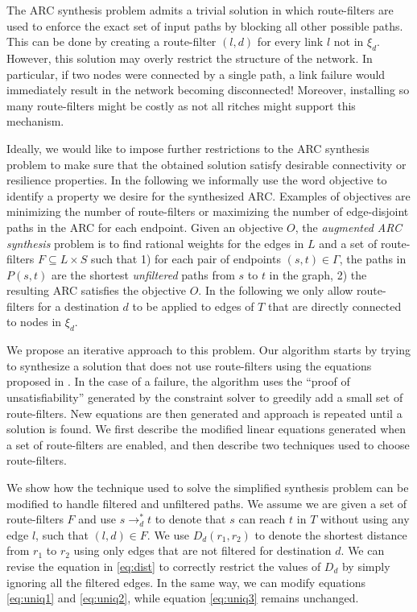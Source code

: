 The ARC synthesis problem admits a trivial solution in which 
route-filters are used to enforce the exact set of input paths by blocking all other possible paths.
This can be done by creating a 
route-filter $(l,d)$ for every link $l$ not in $\xi_d$. 
However, this solution may overly restrict the structure of the network.
In particular, if two nodes were connected by a single path,
a link failure would immediately result in the network becoming disconnected!
Moreover, installing so many route-filters might be costly as not all ritches might
support this mechanism.

Ideally, we would like to impose further restrictions to the ARC
synthesis problem to make sure that the obtained solution
satisfy desirable connectivity or resilience properties.
In the following we informally use the word objective 
to identify a property we desire for the synthesized ARC.
Examples of objectives are minimizing the number of route-filters
or maximizing the number of edge-disjoint paths in the ARC
for each endpoint. 
Given an objective $O$, the \emph{augmented ARC synthesis} problem
is to find rational weights for the edges in $L$
and a set of route-filters $F\subseteq L\times S$
 such that 
1) for each pair of endpoints $(s,t) \in \Gamma$, 
the paths in $P(s,t)$ are the shortest \emph{unfiltered} paths from $s$ to $t$ 
in the graph,
2) the resulting ARC satisfies the objective $O$. 
In the following we only allow route-filters for a destination $d$ to be applied to edges of $T$ that are directly connected to 
nodes in $\xi_d$. 

We propose an iterative approach to this problem. 
Our algorithm starts by trying to synthesize a solution
that does not use route-filters using the equations proposed in . 
In the case of a failure, the algorithm uses the ``proof of unsatisfiability'' generated by the constraint solver 
to greedily add a small set of route-filters. New equations are then generated and approach is repeated until a solution is found.
We first describe the 
modified linear equations generated when a set of
route-filters are enabled, and then describe two
techniques used to choose route-filters. 

We show how the technique used to solve the simplified synthesis
problem can be modified to handle filtered and unfiltered paths.
We assume we are given a set of route-filters $F$ and 
use $s\rightarrow_d^* t$ to denote that $s$ can reach $t$
in $T$ without using any edge $l$, such that $(l,d)\in F$.
We use $D_d(r_1, r_2)$ to denote the shortest distance from $r_1$ to $r_2$
using only edges that are not filtered for destination $d$.
We can revise the equation in \eqref{eq:dist} to correctly restrict the values of $D_d$
by simply ignoring all the filtered edges. 
In the same way, we can modify equations  \eqref{eq:uniq1} and \eqref{eq:uniq2}, while
equation \eqref{eq:uniq3} remains unchanged.

